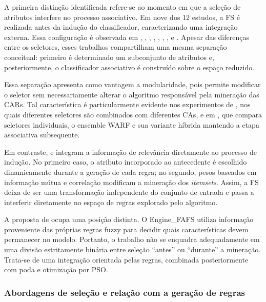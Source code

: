 A primeira distinção identificada refere-se ao momento em que a seleção de
atributos interfere no processo associativo. Em nove dos 12 estudos, a FS é
realizada antes da indução do classificador, caracterizando uma integração
externa. Essa configuração é observada em
,
,
,
,
,
,
,
 e
. Apesar das diferenças entre os seletores, esses
trabalhos compartilham uma mesma separação conceitual: primeiro é determinado um
subconjunto de atributos e, posteriormente, o classificador associativo é
construído sobre o espaço reduzido.

Essa separação apresenta como vantagem a modularidade, pois permite modificar o
seletor sem necessariamente alterar o algoritmo responsável pela mineração das
CARs. Tal característica é particularmente evidente nos experimentos de
, nos quais diferentes seletores são combinados
com diferentes CAs, e em , que compara seletores
individuais, o ensemble WARF e sua variante híbrida mantendo a etapa associativa
subsequente.

Em contraste,  e
 integram a informação de relevância diretamente ao
processo de indução. No primeiro caso, o atributo incorporado ao antecedente é
escolhido dinamicamente durante a geração de cada regra; no segundo, pesos
baseados em informação mútua e correlação modificam a mineração dos
\textit{itemsets}. Assim, a FS deixa de ser uma transformação independente do
conjunto de entrada e passa a interferir diretamente no espaço de regras
explorado pelo algoritmo.

A proposta de  ocupa uma posição distinta. O
Engine\_FAFS utiliza informação proveniente das próprias regras fuzzy para
decidir quais características devem permanecer no modelo. Portanto, o trabalho
não se enquadra adequadamente em uma divisão estritamente binária entre seleção
``antes'' ou ``durante'' a mineração. Trata-se de uma integração orientada pelas
regras, combinada posteriormente com poda e otimização por PSO.

\subsubsection{Abordagens de seleção e relação com a geração de regras}

